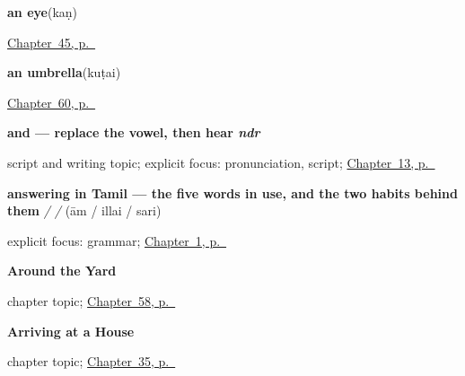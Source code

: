 \noindent\begin{minipage}[t]{\linewidth}
\raggedright
\textbf{an eye}\enspace\emph{}\enspace(kaṇ)\par
\footnotesize \hyperref[ch:ta-body-more]{Chapter~45, p.~\pageref*{ch:ta-body-more}}
\end{minipage}\par\smallskip

\noindent\begin{minipage}[t]{\linewidth}
\raggedright
\textbf{an umbrella}\enspace\emph{}\enspace(kuṭai)\par
\footnotesize \hyperref[ch:ta-things-people-make]{Chapter~60, p.~\pageref*{ch:ta-things-people-make}}
\end{minipage}\par\smallskip

\noindent\begin{minipage}[t]{\linewidth}
\raggedright
\textbf{ and  — replace the vowel, then hear \emph{ndr}}\par
\footnotesize script and writing topic; explicit focus: pronunciation, script; \hyperref[ch:ta-body-parts]{Chapter~13, p.~\pageref*{ch:ta-body-parts}}
\end{minipage}\par\smallskip

\noindent\begin{minipage}[t]{\linewidth}
\raggedright
\textbf{answering in Tamil — the five words in use, and the two habits behind them}\enspace\emph{ /  / }\enspace(ām / illai / sari)\par
\footnotesize explicit focus: grammar; \hyperref[ch:greetings]{Chapter~1, p.~\pageref*{ch:greetings}}
\end{minipage}\par\smallskip

\noindent\begin{minipage}[t]{\linewidth}
\raggedright
\textbf{Around the Yard}\par
\footnotesize chapter topic; \hyperref[ch:ta-around-the-yard]{Chapter~58, p.~\pageref*{ch:ta-around-the-yard}}
\end{minipage}\par\smallskip

\noindent\begin{minipage}[t]{\linewidth}
\raggedright
\textbf{Arriving at a House}\par
\footnotesize chapter topic; \hyperref[ch:ta-arriving-at-a-house]{Chapter~35, p.~\pageref*{ch:ta-arriving-at-a-house}}
\end{minipage}\par\smallskip

